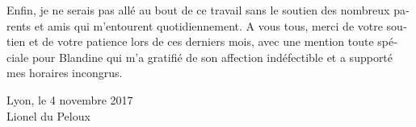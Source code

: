 \begin{otherlanguage}{french}
Enfin, je ne serais pas allé au bout de ce travail sans le soutien des nombreux parents et amis qui m'entourent quotidiennement. A vous tous, merci de votre soutien et de votre patience lors de ces derniers mois, avec une mention toute spéciale pour Blandine qui m'a gratifié de son affection indéfectible et a supporté mes horaires incongrus.

\bigskip
\bigskip

\begin{flushright}
Lyon, le 4 novembre 2017\\
Lionel du Peloux
\end{flushright}

\end{otherlanguage}